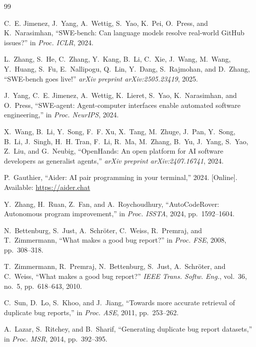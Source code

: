 \documentclass[journal]{IEEEtran}
\begin{document}

\begin{thebibliography}{99}

C.~E. Jimenez, J.~Yang, A.~Wettig, S.~Yao, K.~Pei, O.~Press, and K.~Narasimhan, ``SWE-bench: Can language models resolve real-world GitHub issues?'' in \emph{Proc. ICLR}, 2024.

L.~Zhang, S.~He, C.~Zhang, Y.~Kang, B.~Li, C.~Xie, J.~Wang, M.~Wang, Y.~Huang, S.~Fu, E.~Nallipogu, Q.~Lin, Y.~Dang, S.~Rajmohan, and D.~Zhang, ``SWE-bench goes live!'' \emph{arXiv preprint arXiv:2505.23419}, 2025.

J.~Yang, C.~E. Jimenez, A.~Wettig, K.~Lieret, S.~Yao, K.~Narasimhan, and O.~Press, ``SWE-agent: Agent-computer interfaces enable automated software engineering,'' in \emph{Proc. NeurIPS}, 2024.

X.~Wang, B.~Li, Y.~Song, F.~F. Xu, X.~Tang, M.~Zhuge, J.~Pan, Y.~Song, B.~Li, J.~Singh, H.~H. Tran, F.~Li, R.~Ma, M.~Zhang, B.~Yu, J.~Yang, S.~Yao, Z.~Liu, and G.~Neubig, ``OpenHands: An open platform for AI software developers as generalist agents,'' \emph{arXiv preprint arXiv:2407.16741}, 2024.

P.~Gauthier, ``Aider: AI pair programming in your terminal,'' 2024. [Online]. Available: \url{https://aider.chat}

Y.~Zhang, H.~Ruan, Z.~Fan, and A.~Roychoudhury, ``AutoCodeRover: Autonomous program improvement,'' in \emph{Proc. ISSTA}, 2024, pp.~1592--1604.

N.~Bettenburg, S.~Just, A.~Schr{\"o}ter, C.~Weiss, R.~Premraj, and T.~Zimmermann, ``What makes a good bug report?'' in \emph{Proc. FSE}, 2008, pp.~308--318.

T.~Zimmermann, R.~Premraj, N.~Bettenburg, S.~Just, A.~Schr{\"o}ter, and C.~Weiss, ``What makes a good bug report?'' \emph{IEEE Trans. Softw. Eng.}, vol.~36, no.~5, pp.~618--643, 2010.

C.~Sun, D.~Lo, S.~Khoo, and J.~Jiang, ``Towards more accurate retrieval of duplicate bug reports,'' in \emph{Proc. ASE}, 2011, pp.~253--262.

A.~Lazar, S.~Ritchey, and B.~Sharif, ``Generating duplicate bug report datasets,'' in \emph{Proc. MSR}, 2014, pp.~392--395.


\end{thebibliography}
\end{document}
